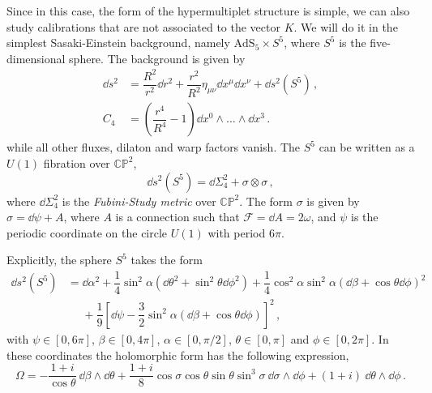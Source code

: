 \documentclass[debug]{phd}
\begin{document}
Since in this case, the form of the hypermultiplet structure is simple, we can also study calibrations that are not associated to the vector $K$. 
We will do it in the simplest Sasaki-Einstein background, namely $\mathrm{AdS}_5 \times S^5$, where $S^5$ is the five-dimensional sphere. 
The background is given by
%
	\begin{equation} 
	\label{ads5bkgrd}
		\begin{split}
			\dd  s^2 &= \dfrac{R^2}{r^2} \dd  r^2 + \dfrac{r^2}{R^2} \eta_{\mu\nu} \dd  x^\mu \dd  x^\nu + \dd  s^2(S^5)\, , \\[1mm]
			C_4 &= \left(\dfrac{r^4}{R^4} - 1\right) \dd  x^0 \wedge \ldots \wedge \dd  x^3\, .
		\end{split}
	\end{equation} 
%
while all other fluxes, dilaton and warp factors vanish.
The $S^5$ can be written as a $U(1)$ fibration over $\mathbb{CP}^2$,
%
	\begin{equation} 
		\dd  s^2(S^5) = \dd  \Sigma_{4}^2 + \sigma \otimes \sigma\, ,
	\end{equation} 
%
where $\dd  \Sigma_{4}^2$ is the \emph{Fubini-Study metric} over $\mathbb{CP}^2$. The form $\sigma$ is given by $\sigma = \dd  \psi + A$, where $A$ is a connection such that $\mathcal{F} = \dd  A = 2 \omega$, and $\psi$ is the periodic coordinate on the circle $U(1)$ with period $6\pi$.

Explicitly, the sphere $S^5$ takes the form~\cite{Gauntlett:2004yd}
%
	\begin{equation} 
		\begin{split}
			\dd  s^2(S^5) &= \dd  \alpha ^2 + \dfrac{1}{4} \sin^2 \alpha  (\dd  \theta^2 + \sin^2 \theta \dd  \phi^2) + \dfrac{1}{4} \cos^2 \alpha  \sin^2\alpha  (\dd  \beta + \cos\theta \dd  \phi)^2 \\
				 & \phantom{=} + \dfrac{1}{9}\left[\dd  \psi - \dfrac{3}{2}\sin^2\alpha  (\dd  \beta + \cos\theta \dd  \phi)\right]^2\, ,
		\end{split}
	\end{equation} 
%
with $\psi \in [0,6\pi]$, $\beta \in [0,4\pi]$, $\alpha  \in [0,\pi/2]$, $\theta \in [0,\pi]$ and $\phi \in [0,2\pi]$.
In these coordinates the holomorphic form has the following expression,
%
	\begin{equation} 
		\Omega= - \frac{1+i}{\cos \theta}\ \dd  \beta \wedge \dd  \theta + \frac{1+i}{8} \cos \sigma \cos \theta \sin \theta \sin^3 \sigma\ \dd  \sigma \wedge \dd  \phi + (1+i)\ \dd  \theta \wedge \dd  \phi\, .
	\end{equation} 
%
\end{document}
